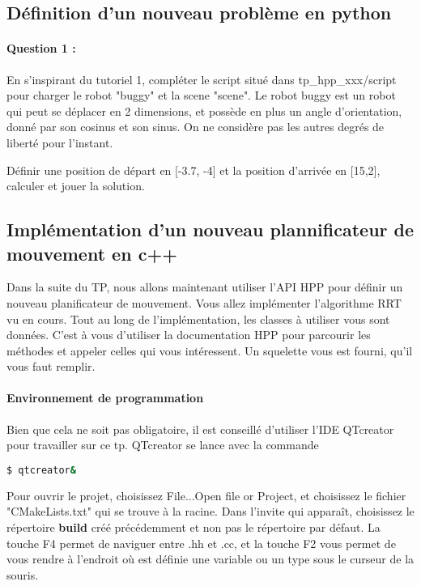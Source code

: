 \documentclass {article}
\begin{document}
\subsection{D\'efinition d'un nouveau probl\`eme en python}
\paragraph {Question 1 :}
En s'inspirant du tutoriel 1, compl\'eter le script situ\'e dans tp\_hpp\_xxx/script pour 
charger le robot "buggy" et la scene "scene".
Le robot buggy est un robot qui peut se d\'eplacer en 2 dimensions, et poss\`ede en plus un angle
d'orientation, donn\'e par son cosinus et son sinus. On ne consid\`ere pas les autres degr\'es de
libert\'e pour l'instant.

D\'efinir une position de d\'epart en [-3.7, -4] et la position d'arriv\'ee en [15,2],
calculer et jouer la solution.

\subsection{Impl\'ementation d'un nouveau plannificateur de mouvement en c++}
Dans la suite du TP, nous allons maintenant utiliser l'API HPP pour d\'efinir un nouveau planificateur de mouvement.
Vous allez impl\'ementer l'algorithme RRT vu en cours.
Tout au long de l'impl\'ementation, les classes \`a utiliser vous sont donn\'ees.
C'est \`a vous d'utiliser la documentation HPP pour parcourir les m\'ethodes et appeler celles qui vous int\'eressent.
Un squelette vous est fourni, qu'il vous faut remplir.

\paragraph{Environnement de programmation}
Bien que cela ne soit pas obligatoire, il est conseill\'e d'utiliser l'IDE QTcreator pour travailler sur ce tp.
QTcreator se lance avec la commande 
\begin{lstlisting}[language=bash]
  $ qtcreator&
\end{lstlisting}

Pour ouvrir le projet, choisissez File...Open file or Project, et choisissez le fichier "CMakeLists.txt"
qui se trouve \`a la racine. Dans l'invite qui appara\^it, choisissez le r\'epertoire \textbf{build} créé pr\'ec\'edemment et non
pas le r\'epertoire par d\'efaut. La touche F4 permet de naviguer entre .hh et .cc, et la touche F2 vous 
permet de vous rendre \`a l'endroit o\`u est d\'efinie une variable ou un type sous le curseur de la souris.
\end{document}
